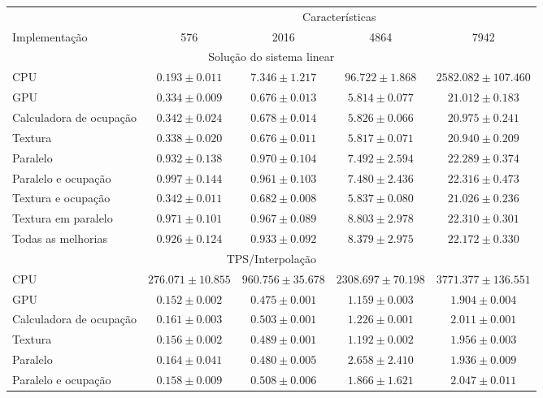 \small
\begin{table}[H]
\begin{tabular}{l*{4}{c}}
    \toprule
    & \multicolumn{4}{c}{Características} \\
    \cmidrule(lr){2-5}
    Implementação & 576 & 2016 & 4864 & 7942\\
    \cmidrule(lr){1-1} \cmidrule(lr){2-5}
    \multicolumn{5}{c}{Solução do sistema linear} \\
    \midrule
    CPU & $0.193 \pm 0.011$ & $7.346 \pm 1.217$ & $96.722 \pm 1.868$ & $2582.082 \pm 107.460$\\
    GPU & $0.334	\pm 0.009$ & $0.676 \pm 0.013$ & $5.814 \pm 0.077$ & $21.012 \pm 0.183$ \\
    Calculadora de ocupação & $0.342 \pm 0.024$ & $0.678 \pm 0.014$ & $5.826 \pm 0.066$ & $20.975 \pm 0.241$\\
    Textura & $0.338 \pm 0.020$ & $0.676 \pm 0.011$ & $5.817 \pm 0.071$ & $20.940 \pm 0.209$ \\
    Paralelo & $0.932 \pm 0.138$	& $0.970 \pm 0.104$	& $7.492 \pm 2.594$	& $22.289 \pm 0.374$ \\
    Paralelo e ocupação & $0.997 \pm 0.144$ & $0.961 \pm 0.103$ & $7.480 \pm 2.436$ & $22.316 \pm 0.473$ \\
    Textura e ocupação & $0.342 \pm 0.011$ & $0.682 \pm 0.008$ & $5.837 \pm 0.080$ & $21.026 \pm 0.236$ \\
    Textura em paralelo & $0.971 \pm 0.101$ & $0.967 \pm 0.089$ & $8.803 \pm 2.978$ & $22.310 \pm 0.301$ \\
    Todas as melhorias & $0.926 \pm 0.124$ & $0.933 \pm 0.092$ & $8.379 \pm 2.975$ & $22.172 \pm 0.330$ \\
    \midrule
    \multicolumn{5}{c}{TPS/Interpolação} \\
    \midrule
    CPU & $276.071 \pm 10.855$ & $960.756 \pm 35.678$ & $2308.697 \pm 70.198$ & $3771.377 \pm 136.551$\\
    GPU & $0.152 \pm 0.002$ & $0.475 \pm 0.001$ & $1.159 \pm 0.003$ & $1.904 \pm 0.004$ \\
    Calculadora de ocupação & $0.161 \pm 0.003$ & $0.503 \pm 0.001$ & $1.226 \pm 0.001$ & $2.011 \pm 0.001$\\
    Textura & $0.156 \pm 0.002$ & $0.489 \pm 0.001$ & $1.192 \pm 0.002$ & $1.956 \pm 0.003$ \\
    Paralelo & $0.164 \pm 0.041$	& $0.480 \pm 0.005$	& $2.658 \pm 2.410$	& $1.936 \pm 0.009$ \\
    Paralelo e ocupação & $0.158 \pm 0.009$ & $0.508 \pm 0.006$ & $1.866 \pm 1.621$ & $2.047 \pm 0.011$ \\

\end{tabular}
\end{table}
